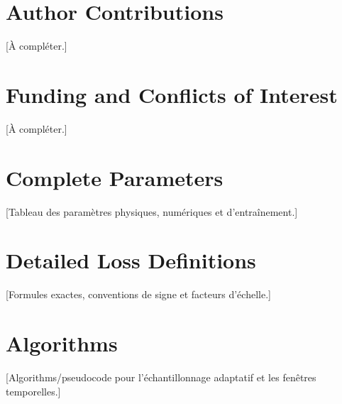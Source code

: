 \documentclass[11pt,a4paper]{article}
\begin{document}
\section*{Author Contributions}
[À compléter.]

\section*{Funding and Conflicts of Interest}
[À compléter.]




\appendix
\section{Complete Parameters}
[Tableau des paramètres physiques, numériques et d'entraînement.]
\section{Detailed Loss Definitions}
[Formules exactes, conventions de signe et facteurs d'échelle.]
\section{Algorithms}
[Algorithms/pseudocode pour l'échantillonnage adaptatif et les fenêtres temporelles.]
\end{document}
